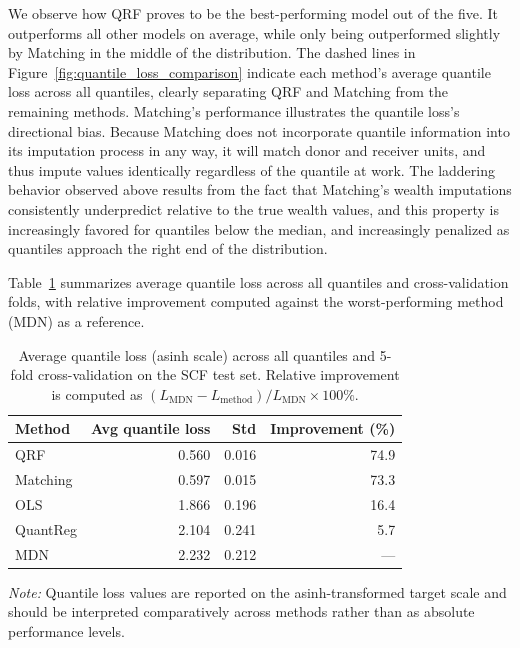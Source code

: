 We observe how QRF proves to be the best-performing model out of the five. It outperforms all other models on average, while only being outperformed slightly by Matching in the middle of the distribution. The dashed lines in Figure~\ref{fig:quantile_loss_comparison} indicate each method's average quantile loss across all quantiles, clearly separating QRF and Matching from the remaining methods. Matching's performance illustrates the quantile loss's directional bias. Because Matching does not incorporate quantile information into its imputation process in any way, it will match donor and receiver units, and thus impute values identically regardless of the quantile at work. The laddering behavior observed above results from the fact that Matching's wealth imputations consistently underpredict relative to the true wealth values, and this property is increasingly favored for quantiles below the median, and increasingly penalized as quantiles approach the right end of the distribution.

Table~\ref{tab:avg_quantile_loss} summarizes average quantile loss across all quantiles and cross-validation folds, with relative improvement computed against the worst-performing method (MDN) as a reference.

\begin{table}[H]
    \centering
    \caption{Average quantile loss (asinh scale) across all quantiles and 5-fold cross-validation on the SCF test set. Relative improvement is computed as $(L_{\text{MDN}} - L_{\text{method}}) / L_{\text{MDN}} \times 100\%$.}
    \label{tab:avg_quantile_loss}
    \begin{tabular}{lrrr}
        \toprule
        Method & Avg quantile loss & Std & Improvement (\%) \\
        \midrule
        QRF & 0.560 & 0.016 & 74.9 \\
        Matching & 0.597 & 0.015 & 73.3 \\
        OLS & 1.866 & 0.196 & 16.4 \\
        QuantReg & 2.104 & 0.241 & 5.7 \\
        MDN & 2.232 & 0.212 & --- \\
        \bottomrule
    \end{tabular}
    \vspace{0.5em}
    \par\noindent\footnotesize\textit{Note:} Quantile loss values are reported on the asinh-transformed target scale and should be interpreted comparatively across methods rather than as absolute performance levels.
\end{table}

